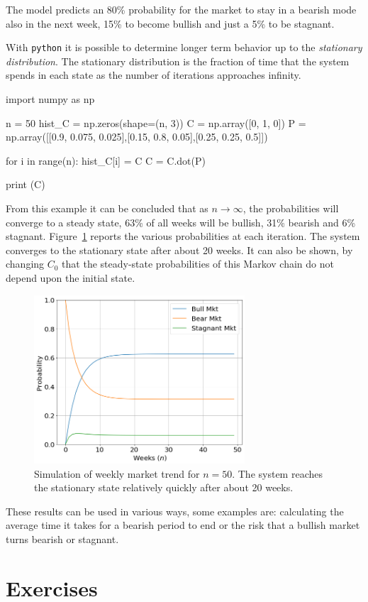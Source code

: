 The model predicts an 80\% probability for the market to stay in a bearish mode also in the next week, 15\% to become bullish and just a 5\% to be stagnant.

With \texttt{python} it is possible to determine longer term behavior up to the \emph{stationary distribution}. The stationary distribution is the fraction of time that the system spends in each state as the number of iterations approaches infinity.

\begin{ipythonnon}
import numpy as np

n = 50
hist_C = np.zeros(shape=(n, 3))
C = np.array([0, 1, 0])
P = np.array([[0.9, 0.075, 0.025],[0.15, 0.8, 0.05],[0.25, 0.25, 0.5]])

for i in range(n):
    hist_C[i] = C
    C = C.dot(P)

print (C)
\end{ipythonnon}
\begin{ioutput}
[0.62499979 0.31250019 0.06250002]
\end{ioutput}

From this example it can be concluded that as $n \rightarrow \infty$, the probabilities will converge to a steady state, 63\% of all weeks will be bullish, 31\% bearish and 6\% stagnant. Figure~\ref{fig:markov_chain_sim} reports the various probabilities at each iteration. The system converges to the stationary state after about 20 weeks.
It can also be shown, by changing $C_0$ that the steady-state probabilities of this Markov chain do not depend upon the initial state. 

\begin{figure}[!t]
	\centering
	\includegraphics[width=0.7\textwidth]{figures/markov_chain_sim}
	\caption{Simulation of weekly market trend for $n=50$. The system reaches the stationary state relatively quickly after about 20 weeks.}
	\label{fig:markov_chain_sim}
\end{figure}

These results can be used in various ways, some examples are: calculating the average time it takes for a bearish period to end or the risk that a bullish market turns bearish or stagnant.

\section*{Exercises}










